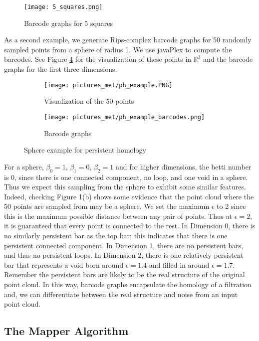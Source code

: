 \documentclass[12pt]{article}
\theoremstyle{definition}
\newcommand{\RR}{\mathbb{R}}
\begin{document}
\begin{figure}[h]
\centering
\texttt{[image: 5\_squares.png]}
\caption{Barcode graphs for 5 squares}
\label{squaresbarcodes}
\end{figure}
As a second example, we generate Rips-complex barcode graphs for 50 randomly sampled points from a sphere of radius 1. We use javaPlex\cite{Javaplex} to compute the barcodes. See Figure \ref{phsphereexample} for the visualization of these points in $\RR^3$ and the barcode graphs for the first three dimensions.
\begin{figure}[H]
\centering
\begin{subfigure}{.5\textwidth}
  \centering
  \texttt{[image: pictures\_met/ph\_example.PNG]} 
  \caption{Visualization of the 50 points}
  \label{3dsphere} 
\end{subfigure}%
\begin{subfigure}{.5\textwidth}
  \centering
  \texttt{[image: pictures\_met/ph\_example\_barcodes.png]} 
  \caption{Barcode graphs}
  \label{spherebarcodes}
\end{subfigure}
\caption{Sphere example for persistent homology}
\label{phsphereexample}
\end{figure}
\par For a sphere, $\beta_0=1$, $\beta_1=0$, $\beta_2=1$ and for higher dimensions, the betti number is 0, since there is one connected component, no loop, and one void in a sphere. Thus we expect this sampling from the sphere to exhibit some similar features. Indeed, checking Figure 1(b) shows some evidence that the point cloud where the 50 points are sampled from may be a sphere. We set the maximum $\epsilon$ to 2 since this is the maximum possible distance between any pair of points. Thus at $\epsilon=2$, it is guaranteed that every point is connected to the rest. In Dimension 0, there is no similarly persistent bar as the top bar; this indicates that there is one persistent connected component. In Dimension 1, there are no persistent bars, and thus no persistent loops. In Dimension 2, there is one relatively persistent bar that represents a void born around $\epsilon=1.4$ and filled in around $\epsilon=1.7$. Remember the persistent bars are likely to be the real structure of the original point cloud. In this way, barcode graphs encapsulate the homology of a filtration and, we can differentiate between the real structure and noise from an input point cloud. 
\subsection{The Mapper Algorithm}
\end{document}
